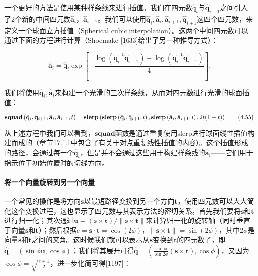 \documentclass[
  paper=a4,
  ,captions=tableheading
]{scrartcl}
\begin{document}
一个更好的方法是使用某种样条线来进行插值。我们在四元数\(\hat{\mathbf{q}}_{i}\)与\(\hat{\mathbf{q}}_{i+1}\)之间引入了2个新的中间四元数\(\hat{\mathbf{a}}_{i}\)，\(\hat{\mathbf{a}}_{i+1}\)。我们可以使用\(\hat{\mathbf{q}}_{i},\hat{\mathbf{a}}_{i},\hat{\mathbf{a}}_{i+1},\hat{\mathbf{q}}_{i+1}\)这四个四元数，来定义一个球面立方插值（Spherical
cubic
interpolation）。这两个中间四元数可以通过下面的方程进行计算（Shoemake
{[}1633{]}给出了另一种推导方式）：

\[
  \hat{\mathbf{a}}_{i}=
  \hat{\mathbf{q}}_{i} \exp \left[-\frac{\log \left(\hat{\mathbf{q}}_{i}^{-1} \hat{\mathbf{q}}_{i-1}\right)+\log \left(\hat{\mathbf{q}}_{i}^{-1}
      \hat{\mathbf{q}}_{i+1}\right)}{4}\right].
  \tag{4.54}
\]

我们将使用\(\hat{\mathbf{q}}_{i},\hat{\mathbf{a}}_{i}\)来构建一个光滑的三次样条线，从而对四元数进行光滑的球面插值：

\[
  \mathbf{squad}\left(\hat{\mathbf{q}}_{i}, \hat{\mathbf{q}}_{i+1}, \hat{\mathbf{a}}_{i}, \hat{\mathbf{a}}_{i+1}, t\right)=\\
  \mathbf{slerp}\left(
  \mathbf{slerp}\left(\hat{\mathbf{q}}_{i},
  \hat{\mathbf{q}}_{i+1}, t\right),
  \mathbf{slerp}\left(\hat{\mathbf{a}}_{i},
  \hat{\mathbf{a}}_{i+1}, t\right), 2 t(1-t)
  \right)
  \tag{4.55}
\]

从上述方程中我们可以看到，\(\mathbf{squad}\)函数是通过重复使用slerp进行球面线性插值构建而成的（章节17.1.1中包含了有关于对点重复线性插值的内容）。这个插值形成的路径，会通过每一个\(\hat{\mathbf{q}}_{i}\)，但是并不会通过这些用于构建样条线的\(\hat{\mathbf{a}}_{i}\)------它们用于指示位于初始位置时的切线方向。

\paragraph{将一个向量旋转到另一个向量}\label{ux5c06ux4e00ux4e2aux5411ux91cfux65cbux8f6cux5230ux53e6ux4e00ux4e2aux5411ux91cf}

一个常见的操作是将方向\(\mathbf{s}\)以最短路径变换到另一个方向\(\mathbf{t}\)，使用四元数可以大大简化这个变换过程，这也显示了四元数与其表示方法的密切关系。首先我们要将\(\mathbf{s}\)和\(\mathbf{t}\)进行归一化；其次通过\(\mathbf{u}=(\mathbf{s} \times \mathbf{t}) /\|\mathbf{s} \times \mathbf{t}\|\)来计算归一化的旋转轴（同时垂直于向量\(\mathbf{s}\)和\(\mathbf{t}\)）；然后根据\(e=\mathbf{s} \cdot \mathbf{t}=\cos (2 \phi) ， \|\mathbf{s} \times \mathbf{t}\|=\sin (2 \phi)\)，其中\(2 \phi\)是向量\(\mathbf{s}\)和\(\mathbf{t}\)之间的夹角。这时候我们就可以表示从\(\mathbf{s}\)变换到\(\mathbf{t}\)的四元数了，即\(\hat{\mathbf{q}}=(\sin \phi \mathbf{u}, \cos \phi)\)；我们将其展开可得\(\hat{\mathbf{q}}=\left(\frac{\sin \phi}{\sin 2 \phi}(\mathbf{s} \times \mathbf{t}), \cos \phi\right)\)，又因为\(\cos \phi=\sqrt{\frac{e+1}{2}}\)，进一步化简可得{[}1197{]}：
\end{document}
